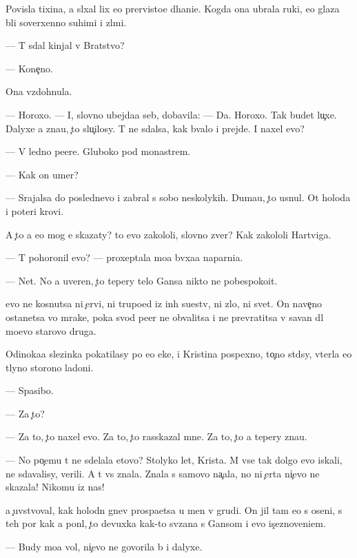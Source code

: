 \documentclass[10pt]{book}
\begin{document}
Povisla tixina, {\y}a sl{\yi}xal lix {\y}e{\y}o prer{\yi}visto{\y}e d{\yi}hani{\y}e. Kogda ona ubrala ruki, {\y}e{\y}o glaza b{\yi}li soverxenno suhimi i zl{\yi}mi.

— T{\yi} sdal kinjal v Bratstvo?

— Kone{\c}no.

Ona vzdohnula.

— Horoxo. — I, slovno ubejda{\y}a seb{\ia}, dobavila: — Da. Horoxo. Tak budet lu{\c}xe. Dalyxe {\y}a zna{\y}u, {\c}to slu{\c}ilosy. T{\yi} ne sdalsa, kak b{\yi}valo i prejde. I naxel {\y}evo?

— V led{\ia}no{\y} pe{\x}ere. Gluboko pod monast{\yi}rem.

— Kak on umer?

— Srajalsa do poslednevo i zabral s sobo{\y} neskolykih. Duma{\y}u, {\c}to usnul. Ot holoda i poteri krovi.

A {\c}to {\y}a {\y}e{\x}o mog {\y}e{\y} skazaty? {\C}to {\y}evo zakololi, slovno zver{\ia}? Kak zakololi Hartviga.

— T{\yi} pohoronil {\y}evo? — proxeptala mo{\y}a b{\yi}vxa{\y}a naparni{\q}a.

— Net. No {\y}a uveren, {\c}to tepery telo Gansa nikto ne pobespoko{\y}it.

{\Y}evo ne kosnutsa ni {\c}ervi, ni trupo{\y}ed{\yi} iz in{\yi}h su{\x}estv, ni zlo, ni svet. On nave{\c}no ostanetsa vo mrake, poka svod pe{\x}er{\yi} ne obvalitsa i ne prevratitsa v savan dl{\ia} mo{\y}evo starovo druga.

Odinoka{\y}a slezinka pokatilasy po {\y}e{\y}o {\x}eke, i Kristina pospexno, to{\c}no st{\yi}d{\ia}sy, v{\yi}terla {\y}e{\y}o t{\yi}lyno{\y} storono{\y} ladoni.

— Spasibo.

— Za {\c}to?

— Za to, {\c}to naxel {\y}evo. Za to, {\c}to rasskazal mne. Za to, {\c}to {\y}a tepery zna{\y}u.

— No po{\c}emu t{\yi} ne sdelala etovo? Stolyko let, Krista. M{\yi} vse tak dolgo {\y}evo iskali, ne sdavalisy, verili. A t{\yi} vs{\e} znala. Znala s samovo na{\c}ala, no ni {\c}erta ni{\c}evo ne skazala! Nikomu iz nas!

{\Y}a {\c}uvstvoval, kak holodn{\yi}{\y} gnev pros{\yi}pa{\y}etsa u men{\ia} v grudi. On jil tam {\y}e{\x}o s oseni, s teh por kak {\y}a pon{\ia}l, {\c}to devuxka kak-to sv{\ia}zana s Gansom i {\y}evo is{\c}eznoveni{\y}em.

— Budy mo{\y}a vol{\ia}, ni{\c}evo ne govorila b{\yi} i dalyxe.
\end{document}
